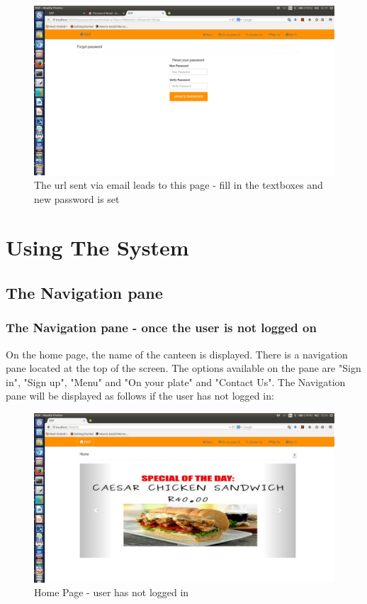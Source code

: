 \documentclass[a4paper,12pt]{report}
\begin{document}
\begin{figure}[H]
  \centering
    \includegraphics[width=1.0\textwidth]{screenshots/newPassForPass.png}
    \caption{The url sent via email leads to this page - fill in the textboxes and new password is set} 
\end{figure}


\section{Using The System} 

\subsection{The Navigation pane} 

\subsubsection{The Navigation pane - once the user is not  logged on}
On the home page, the name of the canteen is displayed. There is a navigation pane located at the top of the screen. The options available on the pane are "Sign in", "Sign up", "Menu" and "On your plate" and "Contact Us". 
The Navigation pane will be displayed as follows if the user has not logged in:

\begin{figure}[H]
  \centering
    \includegraphics[width=1.0\textwidth]{screenshots/sign/homepage.png}
    \caption{Home Page - user has not logged in } 
\end{figure}
\end{document}
